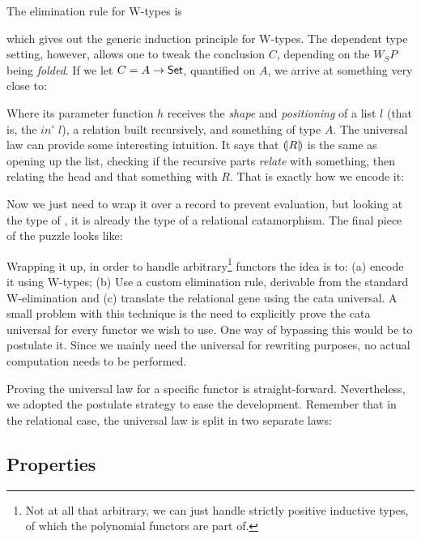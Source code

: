 The elimination rule for W-types is


which gives out the generic induction principle for W-types. The dependent type setting, however, allows
one to tweak the conclusion $C$, depending on the $W_S P$ being \emph{folded}. If we let
$C = A \rightarrow \D{Set}$, quantified on $A$, we arrive at something very close to:


Where its parameter function $h$ receives the \emph{shape} and \emph{positioning} of a list $l$
(that is, the $in^\circ\;l$), a relation built recursively, and something of type $A$.
The universal law can provide some interesting intuition. It says that $\mathopen{(\!|}R\mathclose{|\!)}$ is
the same as opening up the list, checking if the recursive parts \emph{relate} with something,
then relating the head and that something with $R$. That is exactly how we encode it:


Now we just need to wrap it over a record to prevent evaluation, but looking at the type
of , it is already the type of a relational catamorphism. The final piece of the puzzle looks like:


Wrapping it up, in order to handle arbitrary\footnote{
Not at all that arbitrary, we can just handle strictly positive inductive types, of which
the polynomial functors are part of.
} functors the idea is to: (a) encode it using W-types; (b) Use a custom elimination rule, derivable
from the standard W-elimination and (c) translate the relational gene using the cata universal. 
A small problem with this technique is the need to explicitly prove the cata universal for
every functor we wish to use. One way of bypassing this would be to postulate it. Since
we mainly need the universal for rewriting purposes, no actual computation needs to be performed.

Proving the universal law for a specific functor is straight-forward. Nevertheless, we adopted
the postulate strategy to ease the development. Remember that in the relational case, the universal
law is split in two separate laws:



\subsection{Properties}

